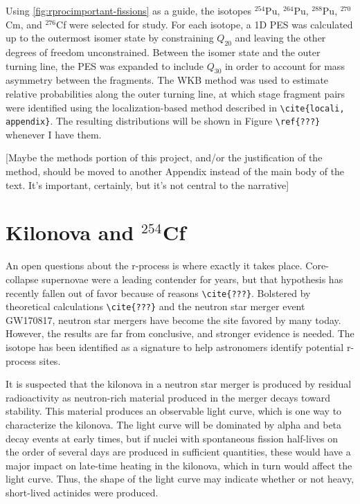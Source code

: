 Using \ref{fig:rprocimportant-fissions} as a guide, the isotopes $^{254}$Pu, $^{264}$Pu, $^{288}$Pu, $^{270}$Cm, and $^{276}$Cf were selected for study. For each isotope, a 1D PES was calculated up to the outermost isomer state by constraining $Q_{20}$ and leaving the other degrees of freedom unconstrained. Between the isomer state and the outer turning line, the PES was expanded to include $Q_{30}$ in order to account for mass asymmetry between the fragments. The WKB method was used to estimate relative probabilities along the outer turning line, at which stage fragment pairs were identified using the localization-based method described in \verb|\cite{locali, appendix}|. The resulting distributions will be shown in Figure \verb|\ref{???}| whenever I have them.

[Maybe the methods portion of this project, and/or the justification of the method, should be moved to another Appendix instead of the main body of the text. It's important, certainly, but it's not central to the narrative]

\section{Kilonova and $^{254}$Cf}

An open questions about the r-process is where exactly it takes place. Core-collapse supernovae were a leading contender for years, but that hypothesis has recently fallen out of favor because of reasons \verb|\cite{???}|. Bolstered by theoretical calculations \verb|\cite{???}| and the neutron star merger event GW170817, neutron star mergers have become the site favored by many today. However, the results are far from conclusive, and stronger evidence is needed. The isotope {\Cf} has been identified as a signature to help astronomers identify potential r-process sites.

It is suspected that the kilonova in a neutron star merger is produced by residual radioactivity as neutron-rich material produced in the merger decays toward stability. This material produces an observable light curve, which is one way to characterize the kilonova. The light curve will be dominated by alpha and beta decay events at early times, but if nuclei with spontaneous fission half-lives on the order of several days are produced in sufficient quantities, these would have a major impact on late-time heating in the kilonova, which in turn would affect the light curve. Thus, the shape of the light curve may indicate whether or not heavy, short-lived actinides were produced.

